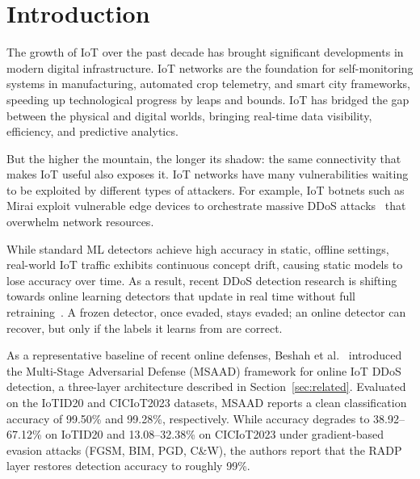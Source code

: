 \documentclass[conference]{IEEEtran}
\begin{document}
\section{Introduction}\label{sec:intro}

The growth of IoT over the past decade has brought significant developments
in modern digital infrastructure. IoT networks are the foundation for
self-monitoring systems in manufacturing, automated crop telemetry, and smart
city frameworks, speeding up technological progress by leaps and bounds. IoT
has bridged the gap between the physical and digital worlds, bringing real-time
data visibility, efficiency, and predictive analytics.

But the higher the mountain, the longer its shadow: the same connectivity
that makes IoT useful also exposes it. IoT networks have many
vulnerabilities waiting to be exploited by different types of attackers. For
example, IoT botnets such as Mirai exploit vulnerable edge devices to
orchestrate massive DDoS attacks~\cite{kolias2017mirai} that overwhelm network
resources.

While standard ML detectors achieve high accuracy in static, offline settings,
real-world IoT traffic exhibits continuous concept drift, causing static models
to lose accuracy over time. As a result, recent DDoS detection research is
shifting towards online learning detectors that update in real time without
full retraining~\cite{beshah2024drift,yang2021pwpae}.
A frozen detector, once evaded, stays evaded; an online detector can recover,
but only if the labels it learns from are correct.

As a representative baseline of recent online defenses, Beshah et
al.~\cite{beshah2025msaad} introduced the Multi-Stage Adversarial Defense
(MSAAD) framework for online IoT DDoS detection, a three-layer architecture
described in Section~\ref{sec:related}. Evaluated on the IoTID20 and CICIoT2023
datasets, MSAAD reports a clean classification accuracy of 99.50\% and 99.28\%,
respectively. While accuracy degrades to 38.92--67.12\% on IoTID20 and
13.08--32.38\% on CICIoT2023 under gradient-based evasion attacks (FGSM, BIM,
PGD, C\&W), the authors report that the RADP layer restores detection accuracy
to roughly 99\%.
\end{document}
